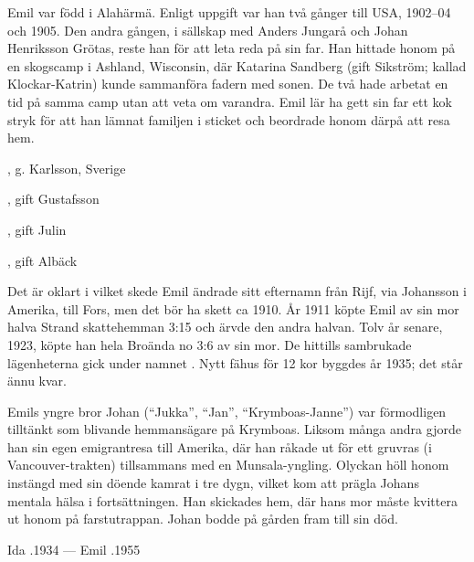Emil var född i Alahärmä. Enligt uppgift var han två gånger till USA, 1902--04 och 1905. Den andra gången, i sällskap med Anders Jungarå och Johan Henriksson Grötas, reste han för att leta reda på sin far. Han hittade honom på en skogscamp i Ashland, Wisconsin, där Katarina Sandberg (gift Sikström; kallad Klockar-Katrin) kunde sammanföra fadern med	sonen. De två hade arbetat en tid på samma camp utan att veta om varandra. Emil lär ha gett sin far ett kok stryk för att han lämnat familjen i sticket och beordrade honom därpå att resa hem.
\begin{jhchildren}
  \item {}, g. Karlsson, Sverige
  \item {}, gift Gustafsson
  \item {}, gift Julin
  \item {}
  \item {}, gift Albäck
\end{jhchildren}
Det är oklart i vilket skede Emil ändrade sitt efternamn från Rijf, via Johansson i Amerika, till Fors, men det bör ha skett ca 1910. År 1911 köpte Emil av sin mor halva Strand skattehemman 3:15 och ärvde den andra halvan. Tolv år senare, 1923, köpte han hela Broända no 3:6 av sin mor. De hittills sambrukade lägenheterna gick under namnet . Nytt fähus för 12 kor byggdes år 1935; det står ännu kvar.

Emils yngre bror Johan (``Jukka'', ``Jan'', ``Krymboas-Janne'') var	förmodligen tilltänkt som blivande hemmansägare på Krymboas. Liksom många andra gjorde han sin egen emigrantresa till Amerika, där han råkade ut för ett gruvras (i Vancouver-trakten) tillsammans med en Munsala-yngling. Olyckan höll honom instängd med sin döende kamrat i tre dygn, vilket kom att prägla Johans mentala hälsa i fortsättningen. Han skickades hem, där hans mor måste kvittera ut honom på farstutrappan. Johan bodde på gården fram till sin död.

Ida .1934  ---	 Emil .1955


